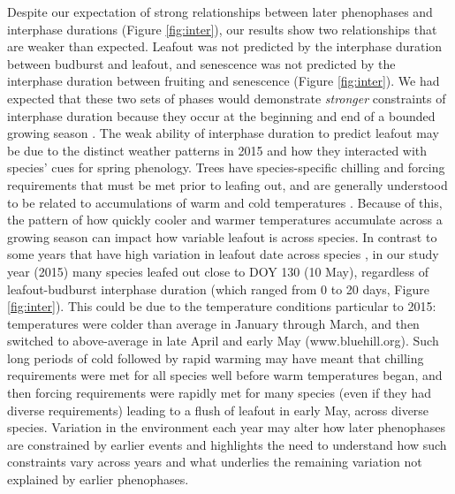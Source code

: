 \documentclass{article}
\begin{document}
\par Despite our expectation of strong relationships between later phenophases and interphase durations (Figure \ref{fig:inter}), our results show two relationships that are weaker than expected. Leafout was not predicted by the interphase duration between budburst and leafout, and senescence was not predicted by the interphase duration between fruiting and senescence (Figure \ref{fig:inter}). We had expected that these two sets of phases would demonstrate \textit{stronger} constraints of interphase duration because they occur at the beginning and end of a bounded growing season \citep{letten2013}. The weak ability of interphase duration to predict leafout may be due to the distinct weather patterns in 2015 and how they interacted with species' cues for spring phenology. Trees have species-specific chilling and forcing requirements that must be met prior to leafing out, and are generally understood to be related to accumulations of warm and cold temperatures \citep[e.g.,][]{schwartz2010,chuine2010,clark2014b}. Because of this, the pattern of how quickly cooler and warmer temperatures accumulate across a growing season can impact how variable leafout is across species. In contrast to some years that have high variation in leafout date across species \citep{lechowicz1995}, in our study year (2015) many species leafed out close to DOY 130 (10 May), regardless of leafout-budburst interphase duration (which ranged from 0 to 20 days, Figure \ref{fig:inter}). This could be due to the temperature conditions particular to 2015: temperatures were colder than average in January through March, and then switched to above-average in late April and early May (www.bluehill.org). Such long periods of cold followed by rapid warming may have meant that chilling requirements were met for all species well before warm temperatures began, and then forcing requirements were rapidly met for many species (even if they had diverse requirements) leading to a flush of leafout in early May, across diverse species. Variation in the environment each year may alter how later phenophases are constrained by earlier events and highlights the need to understand how such constraints vary across years and what underlies the remaining variation not explained by earlier phenophases.
\end{document}
